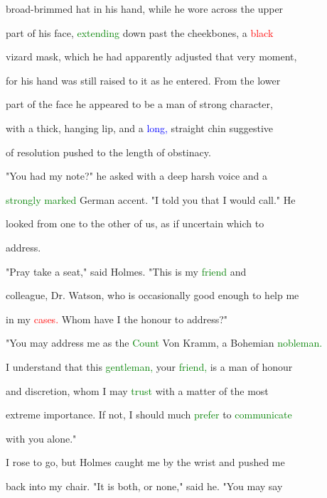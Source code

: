  broad-brimmed hat in his hand, while he wore across the upper

 part of his face, \textcolor{green}{extending} down past the cheekbones, a \textcolor{red}{black}

 vizard mask, which he had apparently adjusted that very moment,

 for his hand was still raised to it as he entered. From the lower

 part of the face he appeared to be a man of strong character,

 with a thick, hanging lip, and a \textcolor{blue}{long,} straight chin suggestive

 of resolution pushed to the length of obstinacy.



 "You had my note?" he asked with a deep harsh voice and a

 \textcolor{green}{strongly} \textcolor{green}{marked} German accent. "I told you that I would call." He

 looked from one to the other of us, as if \textcolor{BurntOrange}{uncertain} which to

 address.



 \textcolor{BurntOrange}{"Pray} take a seat," said Holmes. "This is my \textcolor{green}{friend} and

 colleague, Dr. Watson, who is occasionally \textcolor{BurntOrange}{good} enough to help me

 in my \textcolor{red}{cases.} Whom have I the honour to address?"



 "You may address me as the \textcolor{green}{Count} Von Kramm, a Bohemian \textcolor{green}{nobleman.}

 I understand that this \textcolor{green}{gentleman,} your \textcolor{green}{friend,} is a man of honour

 and \textcolor{BurntOrange}{discretion,} whom I may \textcolor{green}{trust} with a matter of the most

 extreme \textcolor{BurntOrange}{importance.} If not, I should much \textcolor{green}{prefer} to \textcolor{green}{communicate}

 with you alone."



 I rose to go, but Holmes caught me by the wrist and pushed me

 back into my chair. "It is both, or none," said he. "You may say


